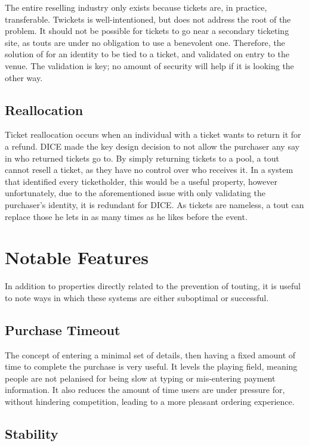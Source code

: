 \documentclass[12pt]{bhamdissertation}
\begin{document}
The entire reselling industry only exists because tickets are, in practice, transferable. Twickets is well-intentioned, but does not address the root of the problem. It should not be possible for tickets to go near a secondary ticketing site, as touts are under no obligation to use a benevolent one. Therefore, the solution of for an identity to be tied to a ticket, and validated on entry to the venue. The validation is key; no amount of security will help if it is looking the other way.

\subsection{Reallocation}

Ticket reallocation occurs when an individual with a ticket wants to return it for a refund. DICE made the key design decision to not allow the purchaser any say in who returned tickets go to. By simply returning tickets to a pool, a tout cannot resell a ticket, as they have no control over who receives it. In a system that identified every ticketholder, this would be a useful property, however unfortunately, due to the aforementioned issue with only validating the purchaser's identity, it is redundant for DICE. As tickets are nameless, a tout can replace those he lets in as many times as he likes before the event. 

\section{Notable Features}

In addition to properties directly related to the prevention of touting, it is useful to note ways in which these systems are either suboptimal or successful.

\subsection{Purchase Timeout}

The concept of entering a minimal set of details, then having a fixed amount of time to complete the purchase is very useful. It levels the playing field, meaning people are not pelanised for being slow at typing or mis-entering payment information. It also reduces the amount of time users are under pressure for, without hindering competition, leading to a more pleasant ordering experience.

\subsection{Stability}
\end{document}
